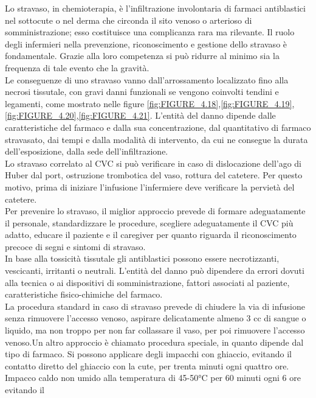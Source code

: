 Lo stravaso, in chemioterapia, è l’infiltrazione involontaria di farmaci antiblastici nel sottocute o nel derma che 
circonda il sito venoso o arterioso di somministrazione; esso costituisce una complicanza rara ma rilevante.
Il ruolo degli infermieri nella prevenzione, riconoscimento e gestione dello stravaso è fondamentale. Grazie alla 
loro competenza si può ridurre al minimo sia la frequenza di tale evento che la gravità.\\ Le conseguenze di uno 
stravaso vanno dall’arrossamento localizzato fino alla necrosi tissutale, con gravi danni funzionali se vengono 
coinvolti  tendini e legamenti, come mostrato nelle figure \ref{fig:FIGURE_4.18},\ref{fig:FIGURE_4.19},
\ref{fig:FIGURE_4.20},\ref{fig:FIGURE_4.21}. 
L’entità del danno dipende dalle caratteristiche del farmaco e dalla sua 
concentrazione, dal quantitativo di farmaco stravasato, dai tempi e dalla modalità di intervento, da cui ne consegue 
la durata dell’esposizione, dalla sede dell’infiltrazione\cite{STRAVASOTOSCANA}.\\
Lo stravaso correlato al CVC si può verificare in caso di dislocazione dell’ago di Huber dal port, ostruzione 
trombotica del vaso, rottura del catetere. Per questo motivo, prima di iniziare l’infusione l’infermiere deve 
verificare la pervietà del catetere.\\
Per prevenire lo stravaso, il miglior approccio prevede di formare adeguatamente il personale, standardizzare le 
procedure, scegliere adeguatamente il CVC più adatto, educare il paziente e il caregiver per quanto riguarda il 
riconoscimento precoce di segni e sintomi di stravaso\cite{AIOMCVC}.\\ 
In base alla tossicità tissutale gli antiblastici possono essere necrotizzanti, vescicanti, irritanti o neutrali.
L’entità del danno può dipendere da errori dovuti alla tecnica o ai dispositivi di somministrazione, 
fattori associati al paziente, caratteristiche fisico-chimiche del farmaco\cite{STRAVASOTOSCANA}.\\
La procedura standard in caso di stravaso prevede di chiudere la via di infusione senza rimuovere l’accesso venoso, 
aspirare delicatamente almeno 3 cc di sangue o liquido, ma non troppo per non far collassare il vaso, per poi 
rimuovere l’accesso venoso.Un altro approccio è chiamato procedura speciale, in quanto dipende dal tipo di farmaco. 
Si possono applicare degli impacchi con ghiaccio, evitando il contatto diretto del ghiaccio con la cute, per trenta 
minuti ogni quattro ore. Impacco caldo non umido alla temperatura di 45-50°C per 60 minuti ogni 6 ore evitando il 
